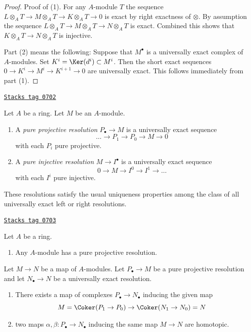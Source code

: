 \begin{proof}
Proof of (1). For any $A$-module $T$ the sequence
$L \otimes_A T \to M \otimes_A T \to K \otimes_A T \to 0$ is exact
by right exactness of $\otimes$. By assumption the sequence
$L \otimes_A T \to M \otimes_A T \to N \otimes_A T$ is exact.
Combined this shows that $K \otimes_A T \to N \otimes_A T$ is injective.

\medskip\noindent
Part (2) means the following: Suppose that $M^\bullet$ is a universally
exact complex of $A$-modules. Set $K^i = \Ker(d^i) \subset M^i$.
Then the short exact sequences $0 \to K^i \to M^i \to K^{i + 1} \to 0$
are universally exact. This follows immediately from part (1).
\end{proof}

\begin{definition}
\label{adequate-definition-pure-resolution}
\href{https://stacks.math.columbia.edu/tag/0702}{\texttt{Stacks tag 0702}}

Let $A$ be a ring. Let $M$ be an $A$-module.
\begin{enumerate}
\item A {\it pure projective resolution} $P_\bullet \to M$
is a universally exact sequence
$$
\ldots \to P_1 \to P_0 \to M \to 0
$$
with each $P_i$ pure projective.
\item A {\it pure injective resolution} $M \to I^\bullet$ is a universally
exact sequence
$$
0 \to M \to I^0 \to I^1 \to \ldots
$$
with each $I^i$ pure injective.
\end{enumerate}
\end{definition}

These resolutions satisfy the usual uniqueness properties among the class
of all universally exact left or right resolutions.

\begin{lemma}
\label{adequate-lemma-pure-projective-resolutions}
\href{https://stacks.math.columbia.edu/tag/0703}{\texttt{Stacks tag 0703}}

Let $A$ be a ring.
\begin{enumerate}
\item Any $A$-module has a pure projective resolution.
\end{enumerate}
Let $M \to N$ be a map of $A$-modules.
Let $P_\bullet \to M$ be a pure projective resolution and
let $N_\bullet \to N$ be a universally exact resolution.
\begin{enumerate}
\item[(2)] There exists a map of complexes $P_\bullet \to N_\bullet$
inducing the given map
$$
M = \Coker(P_1 \to P_0) \to \Coker(N_1 \to N_0) = N
$$
\item[(3)] two maps $\alpha, \beta : P_\bullet \to N_\bullet$
inducing the same map $M \to N$ are homotopic.
\end{enumerate}
\end{lemma}

